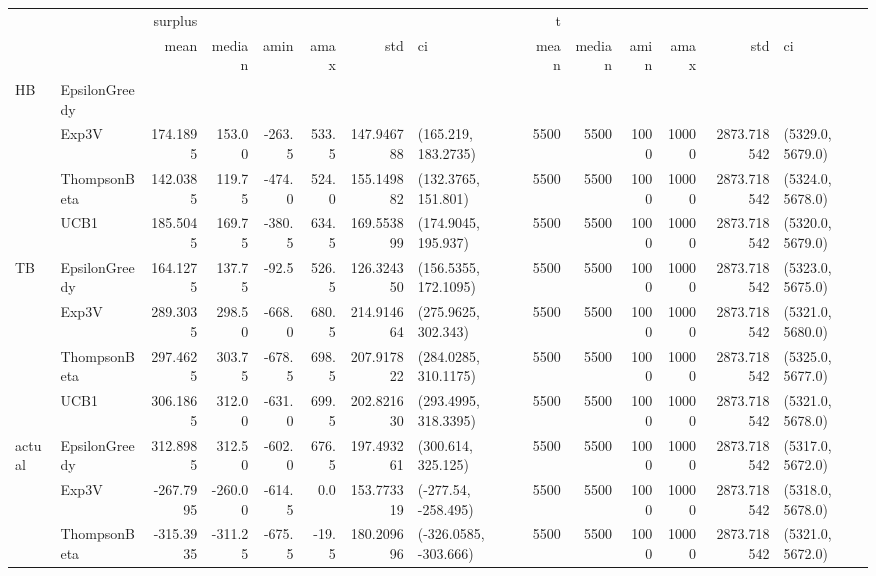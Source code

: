 \begin{tabular}{llrrrrrlrrrrrl}
\toprule
   &               &   surplus &         &        &        &             &                        &     t &        &       &        &              &                   \\
   &               &      mean &  median &   amin &   amax &         std &                     ci &  mean & median &  amin &   amax &          std &                ci \\
\midrule
HB & EpsilonGreedy &           &         &        &        &             &                        &       &        &       &        &              &                   \\
   & Exp3V &  174.1895 &  153.00 & -263.5 &  533.5 &  147.946788 &    (165.219, 183.2735) &  5500 &   5500 &  1000 &  10000 &  2873.718542 &  (5329.0, 5679.0) \\
   & ThompsonBeta &  142.0385 &  119.75 & -474.0 &  524.0 &  155.149882 &    (132.3765, 151.801) &  5500 &   5500 &  1000 &  10000 &  2873.718542 &  (5324.0, 5678.0) \\
   & UCB1 &  185.5045 &  169.75 & -380.5 &  634.5 &  169.553899 &    (174.9045, 195.937) &  5500 &   5500 &  1000 &  10000 &  2873.718542 &  (5320.0, 5679.0) \\
TB & EpsilonGreedy &  164.1275 &  137.75 &  -92.5 &  526.5 &  126.324350 &   (156.5355, 172.1095) &  5500 &   5500 &  1000 &  10000 &  2873.718542 &  (5323.0, 5675.0) \\
   & Exp3V &  289.3035 &  298.50 & -668.0 &  680.5 &  214.914664 &    (275.9625, 302.343) &  5500 &   5500 &  1000 &  10000 &  2873.718542 &  (5321.0, 5680.0) \\
   & ThompsonBeta &  297.4625 &  303.75 & -678.5 &  698.5 &  207.917822 &   (284.0285, 310.1175) &  5500 &   5500 &  1000 &  10000 &  2873.718542 &  (5325.0, 5677.0) \\
   & UCB1 &  306.1865 &  312.00 & -631.0 &  699.5 &  202.821630 &   (293.4995, 318.3395) &  5500 &   5500 &  1000 &  10000 &  2873.718542 &  (5321.0, 5678.0) \\
actual & EpsilonGreedy &  312.8985 &  312.50 & -602.0 &  676.5 &  197.493261 &     (300.614, 325.125) &  5500 &   5500 &  1000 &  10000 &  2873.718542 &  (5317.0, 5672.0) \\
   & Exp3V & -267.7995 & -260.00 & -614.5 &    0.0 &  153.773319 &    (-277.54, -258.495) &  5500 &   5500 &  1000 &  10000 &  2873.718542 &  (5318.0, 5678.0) \\
   & ThompsonBeta & -315.3935 & -311.25 & -675.5 &  -19.5 &  180.209696 &  (-326.0585, -303.666) &  5500 &   5500 &  1000 &  10000 &  2873.718542 &  (5321.0, 5672.0) \\

\end{tabular}
